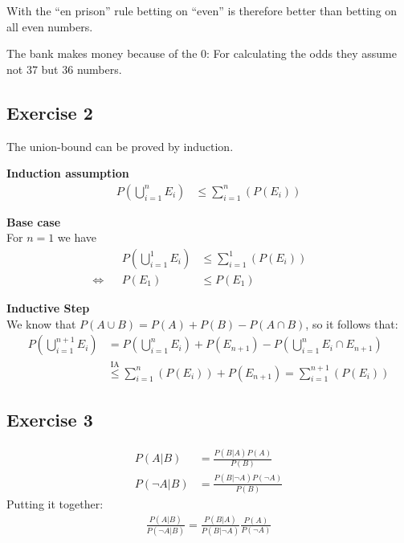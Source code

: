 With the ``en prison'' rule betting on ``even'' is therefore better than betting on all even numbers.

\bigskip

The bank makes money because of the $0$: For calculating the odds they assume not 37 but 36 numbers.


\subsection*{Exercise 2}
\setcounter{equation}{0}
The union-bound can be proved by induction.

\bigskip

\begin{samepage}
\textbf{Induction assumption}
\begin{align}
& & P\left(\bigcup\limits_{i=1}^{n}E_i\right) & \leq \sum\limits_{i=1}^{n}(P(E_i)) & &
\end{align}
\end{samepage}

\begin{samepage}
\textbf{Base case} \\
For $n=1$ we have
\begin{align}
& & P\left(\bigcup\limits_{i=1}^{1}E_i\right) & \leq \sum\limits_{i=1}^{1}(P(E_i)) & & \\
\Leftrightarrow & & P(E_1) & \leq P(E_1) & & 
\end{align}
\end{samepage}

\begin{samepage}
\textbf{Inductive Step} \\
We know that $P(A \cup B) = P(A) + P(B) - P(A \cap B)$, so it follows that:
\begin{align}
P\left(\bigcup\limits_{i=1}^{n+1}E_i\right) &= P\left(\bigcup\limits_{i=1}^{n}E_i\right) + P(E_{n+1}) - P\left(\bigcup\limits_{i=1}^{n}E_i \cap E_{n+1}\right) \\
                                            &\stackrel{\text{IA}}{\leq} \sum\limits_{i=1}^{n}(P(E_i)) + P(E_{n+1}) = \sum\limits_{i=1}^{n+1}(P(E_i))
\end{align}
\end{samepage}

\subsection*{Exercise 3}
\begin{align*}
P(A|B)      & = \frac{P(B|A)P(A)}{P(B)} \\
P(\neg A|B) & = \frac{P(B|\neg A)P(\neg A)}{P(B)}
\end{align*}
Putting it together:
\begin{align*}
\frac{P(A|B)}{P(\neg A|B)} = \frac{P(B|A)}{P(B|\neg A)} \frac{P(A)}{P(\neg A)}
\end{align*}

